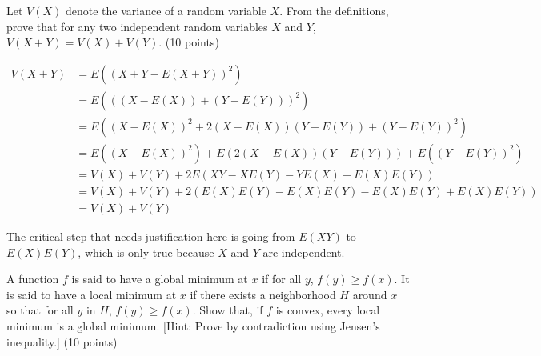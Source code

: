 \documentclass[fleqn]{homework}
\begin{document}
  \maketitle

  \begin{problem}{1}
    \begin{question}
      Let $V(X)$ denote the variance of a random variable $X$.  From the
      definitions, prove that for any two independent random variables $X$ and
      $Y$, $V(X + Y) = V(X) + V(Y)$. (10 points)
    \end{question}

    \begin{align*}
      V(X + Y) &= E((X+Y-E(X+Y))^2) \\
               &= E(((X-E(X)) + (Y-E(Y)))^2) \\
               &= E((X-E(X))^2 + 2(X-E(X))(Y-E(Y)) + (Y-E(Y))^2) \\
               &= E((X-E(X))^2) + E(2(X-E(X))(Y-E(Y))) + E((Y-E(Y))^2) \\
               &= V(X) + V(Y) + 2E(XY - XE(Y) - YE(X) + E(X)E(Y)) \\
               &= V(X) + V(Y) + 2(E(X)E(Y) - E(X)E(Y) - E(X)E(Y) + E(X)E(Y)) \\
               &= V(X) + V(Y)
    \end{align*}

    The critical step that needs justification here is going from $E(XY)$ to
    $E(X)E(Y)$, which is only true because $X$ and $Y$ are independent.
  \end{problem}

  \begin{problem}{2}
    \begin{question}
      A function $f$ is said to have a global minimum at $x$ if for all $y$,
      $f(y) \ge f(x)$.  It is said to have a local minimum at $x$ if there
      exists a neighborhood $H$ around $x$ so that for all $y$ in $H$,
      $f(y) \ge f(x)$.  Show that, if $f$ is convex, every local minimum is a
      global minimum.  [Hint: Prove by contradiction using Jensen's inequality.]
      (10 points)
    \end{question}
  \end{problem}
\end{document}
